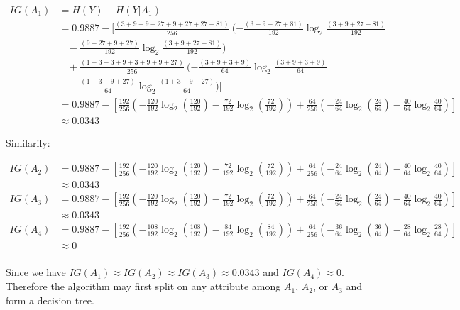 \documentclass[12pt]{article}
\begin{document}
\begin{align*}
    IG(A_1) &= H(Y) - H(Y | A_1) \\
    &= 0.9887 - [ \frac{(3 + 9 + 9 + 27 + 9 + 27 + 27 + 81)}{256}  \ (- \frac{(3 + 9  + 27 + 81)}{192} \log_2 \frac{(3 + 9  + 27 + 81)}{192} \\ &\ \ \ \ - \frac{(9 + 27  + 9 + 27)}{192} \log_2 \frac{(3 + 9  + 27 + 81)}{192}) \  \ \\ &\ \ \ \ +
    \frac{(1 + 3 + 3 + 9 + 3 + 9 + 9 + 27)}{256}  \ (- \frac{(3 + 9  + 3 + 9)}{64} \log_2 \frac{(3 + 9  + 3 + 9)}{64} \\ &\ \ \ \ - \frac{(1 + 3  + 9 + 27)}{64} \log_2 \frac{(1 + 3  + 9 + 27)}{64})] \\
    &= 0.9887 - [\frac{192}{256} (-\frac{120}{192} \log_2(\frac{120}{192}) -\frac{72}{192} \log_2(\frac{72}{192}))  + \frac{64}{256} (-\frac{24}{64} \log_2 (\frac{24}{64}) - \frac{40}{64} \log_2 \frac{40}{64} )] \\
    &\approx 0.0343
\end{align*}

Similarily:

\begin{align*}
    IG(A_2) &= 0.9887 - [\frac{192}{256} (-\frac{120}{192} \log_2(\frac{120}{192}) -\frac{72}{192} \log_2(\frac{72}{192}))  + \frac{64}{256} (-\frac{24}{64} \log_2 (\frac{24}{64}) - \frac{40}{64} \log_2 \frac{40}{64} )] \\
    &\approx 0.0343 \\
    IG(A_3) &= 0.9887 - [\frac{192}{256} (-\frac{120}{192} \log_2(\frac{120}{192}) -\frac{72}{192} \log_2(\frac{72}{192}))  + \frac{64}{256} (-\frac{24}{64} \log_2 (\frac{24}{64}) - \frac{40}{64} \log_2 \frac{40}{64} )] \\
    &\approx 0.0343 \\
    IG(A_4) &= 0.9887 - [\frac{192}{256} (-\frac{108}{192} \log_2(\frac{108}{192}) -\frac{84}{192} \log_2(\frac{84}{192}))  + \frac{64}{256} (-\frac{36}{64} \log_2 (\frac{36}{64}) - \frac{28}{64} \log_2 \frac{28}{64} )] \\
    &\approx 0 \\
\end{align*}

Since we have $IG(A_1) \approx IG(A_2) \approx IG(A_3) \approx 0.0343$ and $IG(A_4) \approx 0$. Therefore the algorithm may first split on any attribute among $A_1$, $A_2$, or $A_3$ and form a decision tree.



\end{document}
